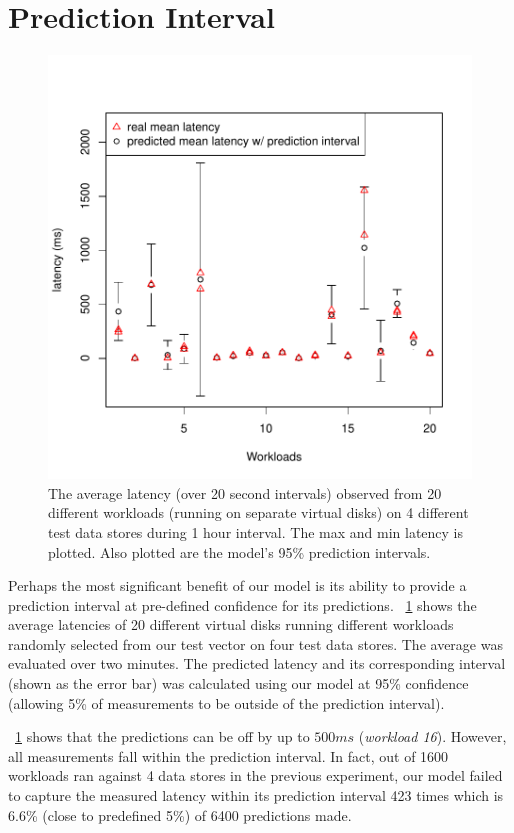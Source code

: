 \section{Prediction Interval}
\begin{figure}[!t]
\centering
\includegraphics[width=0.8\columnwidth, clip, trim=0 0.2in 0 0.7in]{figure/prediction_interval2.pdf}
\captionsetup{format=myformat}
\caption{The average latency (over 20 second intervals) observed from
  20 different workloads (running on separate virtual disks) on 4
  different test data stores during 1 hour interval.  The max and min
  latency is plotted. Also plotted are the model's 95\% prediction
  intervals.}
\label{predInterval}
\end{figure}

Perhaps the most significant benefit of our model is its ability to provide a prediction interval at pre-defined confidence for its predictions.
\figurename~\ref{predInterval} shows the average latencies of 20 different virtual disks running different workloads randomly selected from our test vector on four test data stores.
The average was evaluated over two minutes.
The predicted latency and its corresponding interval (shown as the error bar)  was calculated using our model at 95\% confidence (allowing 5\% of measurements to be outside of the prediction interval).

\figurename~\ref{predInterval} shows that the predictions can be off by up to $500\mathit{ms}$ (\emph{workload 16}).
However, all measurements fall within the prediction interval.
In fact, out of 1600 workloads ran against 4 data stores in the previous experiment, our model failed to capture the measured latency within its prediction interval 423 times which is 6.6\% (close to predefined 5\%) of 6400 predictions made.

